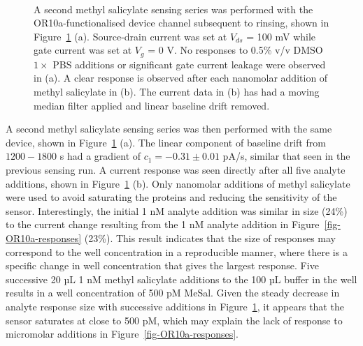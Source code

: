 \documentclass[
  a4paper,
]{scrbook}
\begin{document}
\begin{figure}
\begin{minipage}[t]{0.70\linewidth}
{{}

}

\end{minipage}%
%
\begin{minipage}[t]{0.15\linewidth}

{\centering 

~

}

\end{minipage}%

\caption{\label{fig-OR10a-responses-2}A second methyl salicylate sensing
series was performed with the OR10a-functionalised device channel
subsequent to rinsing, shown in Figure~\ref{fig-OR10a-responses-2} (a).
Source-drain current was set at \(V_{ds}\) = 100 mV while gate current
was set at \(V_g\) = 0 V. No responses to 0.5\% v/v DMSO \(1 \times\)
PBS additions or significant gate current leakage were observed in (a).
A clear response is observed after each nanomolar addition of methyl
salicylate in (b). The current data in (b) has had a moving median
filter applied and linear baseline drift removed.}

\end{figure}

A second methyl salicylate sensing series was then performed with the
same device, shown in Figure~\ref{fig-OR10a-responses-2} (a). The linear
component of baseline drift from \(1200-1800\) s had a gradient of
\(c_1 = -0.31\pm0.01\) pA/s, similar that seen in the previous sensing
run. A current response was seen directly after all five analyte
additions, shown in Figure~\ref{fig-OR10a-responses-2} (b). Only
nanomolar additions of methyl salicylate were used to avoid saturating
the proteins and reducing the sensitivity of the sensor. Interestingly,
the initial 1 nM analyte addition was similar in size (24\%) to the
current change resulting from the 1 nM analyte addition in
Figure~\ref{fig-OR10a-responses} (23\%). This result indicates that the
size of responses may correspond to the well concentration in a
reproducible manner, where there is a specific change in well
concentration that gives the largest response. Five successive 20 µL 1
nM methyl salicylate additions to the 100 µL buffer in the well results
in a well concentration of 500 pM MeSal. Given the steady decrease in
analyte response size with successive additions in
Figure~\ref{fig-OR10a-responses-2}, it appears that the sensor saturates
at close to 500 pM, which may explain the lack of response to micromolar
additions in Figure~\ref{fig-OR10a-responses}.
\end{document}
